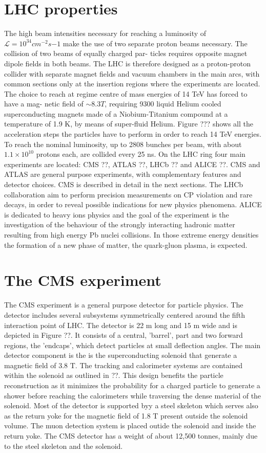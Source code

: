 \section{LHC properties}
The high beam intensities necessary for reaching a luminosity of $\mathcal{L} = 10^{34} cm^{-2}s{-1}$ make the
use of two separate proton beams necessary. The collision of two beams of equally charged par-
ticles requires opposite magnet dipole fields in both beams. The LHC is therefore designed as a
proton-proton collider with separate magnet fields and vacuum chambers in the main arcs, with 
common sections only at the insertion regions where the experiments are located.
The choice to reach at regime centre of mass energies of 14 TeV has forced to have a mag-
netic field of $\sim 8.3 T$, requiring 9300 liquid Helium cooled superconducting magnets made of a
Niobium-Titanium compound at a temperature of 1.9 K, by means of super-fluid Helium. Figure ???
shows all the acceleration steps the particles have to perform in order to reach 14 TeV
energies. To reach the nominal luminosity, up to 2808 bunches per beam, with about $1.1\times 10^{10}$
protons each, are collided every 25 ns.
On the LHC ring four main experiments are located: CMS ??, ATLAS ??, LHCb ?? and
ALICE ??. CMS and ATLAS are general purpose experiments, with complementary features
and detector choices. CMS is described in detail in the next sections. The LHCb collaboration
aim to perform precision measurements on CP violation and rare decays, in order to reveal
possible indications for new physics phenomena. ALICE is dedicated to heavy ions physics and the
goal of the experiment is the investigation of the behaviour of the strongly interacting hadronic
matter resulting from high energy Pb nuclei collisions. In those extreme energy densities the
formation of a new phase of matter, the quark-gluon plasma, is expected.
 
\section{The CMS experiment}

The CMS experiment is a general purpose detector for particle physics. The detector
includes several subsystems symmetrically centered around
the fifth interaction point of LHC. The detector is 22 m long and 15 m wide and is depicted in Figure ??.
It consists of a central, ’barrel’, part and two forward regions, the ’endcaps’, which
detect particles at small deflection angles.
The main detector component is the is the
superconducting solenoid that generate a magnetic field of 3.8 T. The tracking and calorimeter
systems are contained within the solenoid as outlined in ??. This design benefits
the particle reconstruction as it minimizes the probability for a charged particle to
generate a shower before reaching the calorimeters while traversing the dense material of
the solenoid. Most of the detector is supported byy
a steel skeleton which serves also as the return yoke for the magnetic field of 1.8 T
present outside the solenoid volume.
The muon detection system is placed outide the solenoid and inside the return yoke. The CMS detector has a weight
of about 12,500 tonnes, mainly due to the steel skeleton and the solenoid.


